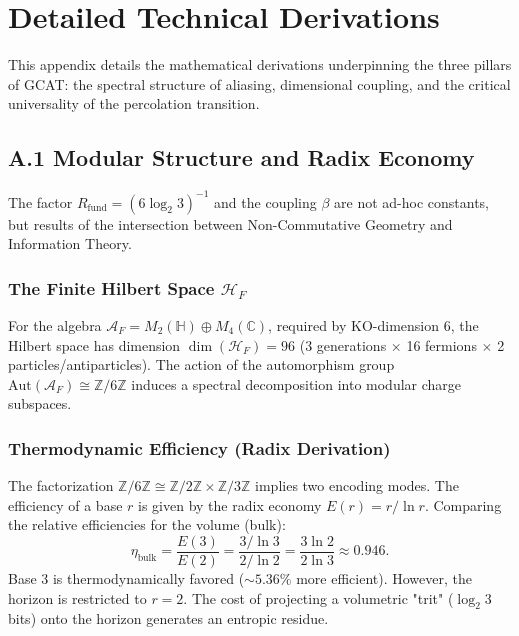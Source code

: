\documentclass[12pt, a4paper]{article}
\theoremstyle{plain}
\theoremstyle{definition}
\begin{document}
\section{Detailed Technical Derivations}
\label{app:derivations}

This appendix details the mathematical derivations underpinning the three pillars of GCAT: the spectral structure of aliasing, dimensional coupling, and the critical universality of the percolation transition.

\subsection{A.1 Modular Structure and Radix Economy}
\label{app:spectral_trace}

The factor $R_{\text{fund}} = (6\log_2 3)^{-1}$ and the coupling $\beta$ are not ad-hoc constants, but results of the intersection between Non-Commutative Geometry and Information Theory.

\subsubsection{The Finite Hilbert Space \texorpdfstring{$\mathcal{H}_F$}{H\_F}}
For the algebra $\mathcal{A}_F = M_2(\mathbb{H}) \oplus M_4(\mathbb{C})$, required by KO-dimension 6, the Hilbert space has dimension $\dim(\mathcal{H}_F) = 96$ (3 generations $\times$ 16 fermions $\times$ 2 particles/antiparticles). The action of the automorphism group $\text{Aut}(\mathcal{A}_F) \cong \mathbb{Z}/6\mathbb{Z}$ induces a spectral decomposition into modular charge subspaces.

\subsubsection{Thermodynamic Efficiency (Radix Derivation)}
The factorization $\mathbb{Z}/6\mathbb{Z} \cong \mathbb{Z}/2\mathbb{Z} \times \mathbb{Z}/3\mathbb{Z}$ implies two encoding modes. The efficiency of a base $r$ is given by the radix economy $E(r) = r/\ln r$.
Comparing the relative efficiencies for the volume (bulk):
\begin{equation}
\eta_{\text{bulk}} = \frac{E(3)}{E(2)} = \frac{3/\ln 3}{2/\ln 2} = \frac{3 \ln 2}{2 \ln 3} \approx 0.946.
\end{equation}
Base 3 is thermodynamically favored ($\sim 5.36\%$ more efficient). However, the horizon is restricted to $r=2$. The cost of projecting a volumetric "trit" ($\log_2 3$ bits) onto the horizon generates an entropic residue.
\end{document}

